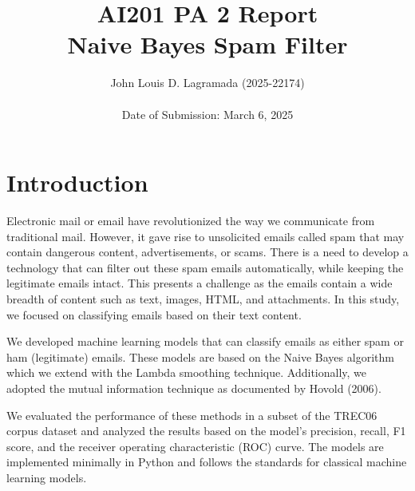 \documentclass{acm_proc_article-sp}
\begin{document}
\title{AI201 PA 2 Report\\ Naive Bayes Spam Filter}

\author{
\alignauthor John Louis D. Lagramada (2025-22174)\\ %
~\\
Date of Submission: March 6, 2025
}
\makeatletter
{}
\makeatother

\maketitle


\section{Introduction}

Electronic mail or email have revolutionized the way we communicate from traditional mail. However, it gave rise to unsolicited emails called spam that may contain dangerous content, advertisements, or scams.
There is a need to develop a technology that can filter out these spam emails automatically, while keeping the legitimate emails intact. This presents a challenge as the emails contain a wide breadth of content such as text, images, HTML, and attachments. In this study, we focused on classifying emails based on their text content.

We developed machine learning models that can classify emails as either spam or ham (legitimate) emails. These models are based on the Naive Bayes algorithm which we extend with the Lambda smoothing technique. Additionally, we adopted the mutual information technique as documented by Hovold (2006).

We evaluated the performance of these methods in a subset of the TREC06 corpus dataset and analyzed the results based on the model's precision, recall, F1 score, and the receiver operating characteristic (ROC) curve. The models are implemented minimally in Python and follows the standards for classical machine learning models.
\end{document}
